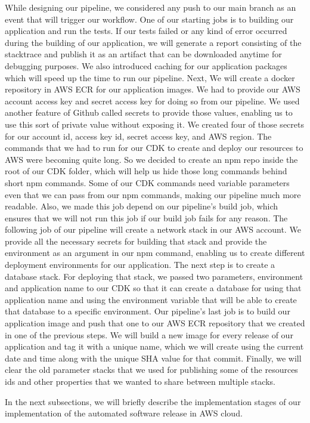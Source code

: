 While designing our pipeline, we considered any push to our main branch as an event that will trigger our workflow. One of our starting jobs is to building our application and run the tests. If our tests failed or any kind of error occurred during the building of our application, we will generate a report consisting of the stacktrace and publish it as an artifact that can be downloaded anytime for debugging purposes. We also introduced caching for our application packages which will speed up the time to run our pipeline. Next, We will create a docker repository in AWS ECR for our application images. We had to provide our AWS account access key and secret access key for doing so from our pipeline. We used another feature of Github called secrets to provide those values, enabling us to use this sort of private value without exposing it. We created four of those secrets for our account id, access key id, secret access key, and AWS region. The commands that we had to run for our CDK to create and deploy our resources to AWS were becoming quite long. So we decided to create an npm repo inside the root of our CDK folder, which will help us hide those long commands behind short npm commands. Some of our CDK commands need variable parameters even that we can pass from our npm commands, making our pipeline much more readable. Also, we made this job depend on our pipeline's build job, which ensures that we will not run this job if our build job fails for any reason. The following job of our pipeline will create a network stack in our AWS account. We provide all the necessary secrets for building that stack and provide the environment as an argument in our npm command, enabling us to create different deployment environments for our application. The next step is to create a database stack. For deploying that stack, we passed two parameters, environment and application name to our CDK so that it can create a database for using that application name and using the environment variable that will be able to create that database to a specific environment. Our pipeline's last job is to build our application image and push that one to our AWS ECR repository that we created in one of the previous steps. We will build a new image for every release of our application and tag it with a unique name, which we will create using the current date and time along with the unique SHA value for that commit. Finally, we will clear the old parameter stacks that we used for publishing some of the resources ids and other properties that we wanted to share between multiple stacks.

In the next subsections, we will briefly  describe the implementation stages of our implementation of the automated software release in AWS cloud. 

